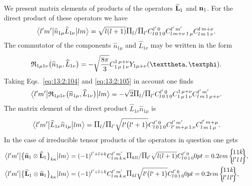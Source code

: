 We present matrix elements of products of the operators \(\widehat{\mathbf{L}}_{1}\) and \(\mathbf{n}_{1}\). For the direct product of these operators we have
\begin{equation}
\braOket{ l^{\prime} m^{\prime}}{ \widehat{n}_{1 \mu} \widehat{L}_{1 \nu}}{l m}=\sqrt{l(l+1)}\Fact{l}/\Fact{l^{\prime}}
\clebsch{l}{0}{1}{0}{l^{\prime}}{0}
\clebsch{l}{m+\nu}{1}{\mu}{l^{\prime}}{m^{\prime}} 
\clebsch{l}{m}{1}{\nu}{l}{m+\nu}. \label{eq:13:2:69}
\end{equation}
The commutator of the components \(\widehat{n}_{1 \mu}\) and \(\widehat{L}_{1 \nu}\) may be written in the form
\begin{equation}
\mathfrak{R}_{1 \mu 1 \nu}\bigl(\widehat{n}_{1 \mu}, \widehat{L}_{1 \nu}\bigr)=-\sqrt{\frac{8 \pi}{3}} 
\clebsch{1}{\mu}{1}{\nu}{1}{\mu+\nu} Y_{1 \mu+\nu}(\vartheta, \varphi). \label{eq:13:2:70}
\end{equation}
Taking Eqs.~\eqref{eq:13:2:104} and \eqref{eq:13:2:105} in account one finds
\begin{equation}
\braOket{ l^{\prime} m^{\prime}}{ \mathfrak{R}_{1 \mu 1 \nu}\bigl(\widehat{n}_{1 \mu}, \widehat{L}_{1 \nu}\bigr)}{l m}=-\sqrt{2}\Fact{l}/\Fact{l^{\prime}}
\clebsch{l}{0}{1}{0}{l^{\prime}}{0}
\clebsch{1}{\mu}{1}{\nu}{1}{\mu+\nu} 
\clebsch{l}{m}{1}{\mu+\nu}{l^{\prime}}{m^{\prime}}. \label{eq:13:2:71}
\end{equation}
The matrix element of the direct product \(\widehat{L}_{1 \nu} \widehat{n}_{1 \mu}\) is
\begin{equation}
\braOket{ l^{\prime} m^{\prime}}{ \widehat{L}_{1 \nu} \widehat{n}_{1 \mu}}{l m}=\Fact{l}/\Fact{l^\prime}
\sqrt{ l^{\prime}\bigl(l^{\prime}+1\bigr)} 
\clebsch{l}{0}{1}{0}{l^{\prime}}{0} 
\clebsch{l^{\prime}}{m+\mu}{1}{\nu}{l^{\prime}}{m^{\prime}} 
\clebsch{l}{m}{1}{\mu}{l^{\prime}}{m+\mu}. \label{eq:13:2:72}
\end{equation}
In the case of irreducible tensor products of the operators in question one gets
\begin{align}
& 
\braOket{ l^{\prime} m^{\prime}}{\bigl\{\widehat{\vect{n}}_{1} \otimes \widehat{\vect{L}}_{1}\bigr\}_{k \kappa}}{l m}=(-1)^{l^{\prime}+l+k} 
\clebsch{l}{m}{k}{\kappa}{l^{\prime}}{m^{\prime}} \Fact{k l l}/\Fact{l^\prime}\sqrt{ l(l+1)}
\clebsch{l}{0}{1}{0}{l^{\prime}}{0}
\sixj{1}{1}{k}{l^{\prime}}{l}{l},  \label{eq:13:2:73}\\
& 
\braOket{ l^{\prime} m^{\prime}}{\bigl\{\widehat{\vect{L}}_{1} \otimes \widehat{\vect{n}}_{1}\bigr\}_{k \kappa}}{l m}=(-1)^{l^{\prime}+l+k} 
\clebsch{l}{m}{k}{\kappa}{l^{\prime}}{m^{\prime}} \Fact{k l }\sqrt{ l^{\prime}\bigl(l^{\prime}+1\bigr)} 
\clebsch{l}{0}{1}{0}{l^{\prime}}{0}
\sixj{1}{1}{k}{l^{\prime}}{l}{l^{\prime}}, \label{eq:13:2:74}
\end{align}
